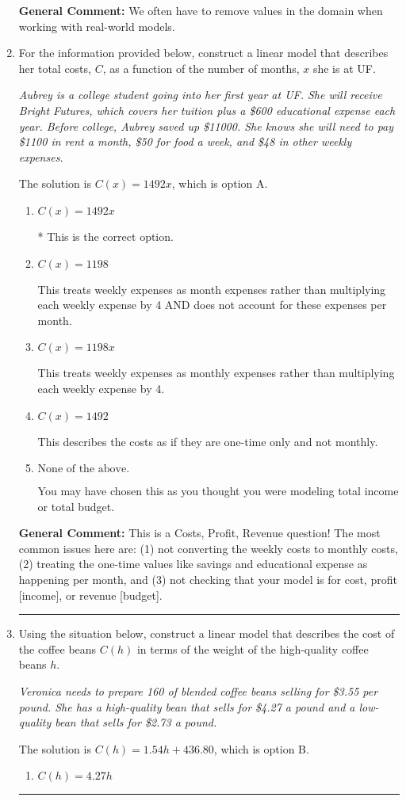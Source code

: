 \documentclass{extbook}[14pt]
\newcommand{\litem}[1]{\item #1

\rule{\textwidth}{0.4pt}}
\begin{document}
\begin{enumerate}
{\textbf{General Comment:} We often have to remove values in the domain when working with real-world models.
}
\litem{
For the information provided below, construct a linear model that describes her total costs, $C$, as a function of the number of months, $x$ she is at UF. 

\begin{center}
    \textit{ Aubrey is a college student going into her first year at UF. She will receive Bright Futures, which covers her tuition plus a \$600 educational expense each year. Before college, Aubrey saved up \$11000. She knows she will need to pay \$1100 in rent a month, \$50 for food a week, and \$48 in other weekly expenses. }
\end{center}
The solution is \( C(x) = 1492 x \), which is option A.\begin{enumerate}[label=\Alph*.]
\item \( C(x) = 1492 x \)

* This is the correct option.
\item \( C(x) = 1198 \)

This treats weekly expenses as month expenses rather than multiplying each weekly expense by 4 AND does not account for these expenses per month.
\item \( C(x) = 1198 x \)

This treats weekly expenses as monthly expenses rather than multiplying each weekly expense by 4.
\item \( C(x) = 1492 \)

This describes the costs as if they are one-time only and not monthly.
\item \( \text{None of the above.} \)

You may have chosen this as you thought you were modeling total income or total budget.
\end{enumerate}

\textbf{General Comment:} This is a Costs, Profit, Revenue question! The most common issues here are: (1) not converting the weekly costs to monthly costs, (2) treating the one-time values like savings and educational expense as happening per month, and (3) not checking that your model is for cost, profit [income], or revenue [budget].
}
\litem{
Using the situation below, construct a linear model that describes the cost of the coffee beans $C(h)$ in terms of the weight of the high-quality coffee beans $h$.

\begin{center}
    \textit{ Veronica needs to prepare 160 of blended coffee beans selling for \$3.55 per pound. She has a high-quality bean that sells for \$4.27 a pound and a low-quality bean that sells for \$2.73 a pound. }
\end{center}
The solution is \( C(h) = 1.54 h + 436.80 \), which is option B.\begin{enumerate}[label=\Alph*.]
\item \( C(h) = 4.27 h \)


\end{enumerate}}
\end{enumerate}
\end{document}
